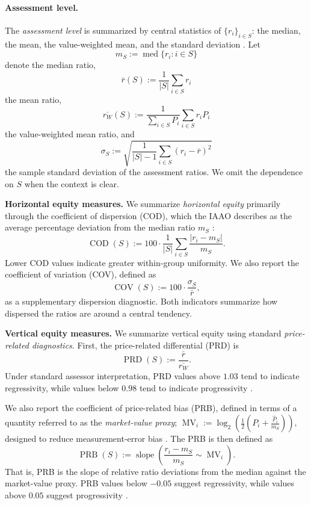 \documentclass{article}
\theoremstyle{plain}
\theoremstyle{definition}
\newcommand{\1}{\mathbf{1}}
\begin{document}
\paragraph{Assessment level.}
The \emph{assessment level} is summarized by central statistics of $\{r_i\}_{i\in S}$: the median, the mean, the value-weighted mean, and the standard deviation \cite{IAAO2025ExposureRatio}. Let
\[
m_S := \operatorname{med}\{r_i: i\in S\}
\]
denote the median ratio,
\[
\bar r (S) := \frac{1}{|S|}\sum_{i\in S} r_i
\]
the mean ratio,
\[
\overline{r_W} (S) := \frac{1}{\sum_{i\in S} P_i}\sum_{i\in S} r_i P_i
\]
the value-weighted mean ratio, and
\[
\sigma_S := \sqrt{\frac{1}{|S|-1}\sum_{i\in S}(r_i-\bar r)^2}
\]
the sample standard deviation of the assessment ratios. We omit the dependence on $S$ when the context is clear.

\medskip
\noindent\textbf{Horizontal equity measures.}
We summarize \textit{horizontal equity} primarily through the coefficient of dispersion (COD), which the IAAO describes as the average percentage deviation from the median ratio $m_S$ \cite{IAAO2013Ratio,IAAO2025ExposureRatio}:
\begin{equation}
\label{eq:cod}
\operatorname{COD}(S)
:=
100\cdot\frac{1}{|S|}
\sum_{i\in S}\frac{|r_i-m_S|}{m_S}.
\end{equation}
Lower COD values indicate greater within-group uniformity. We also report the coefficient of variation (COV), defined as
\begin{equation}
\label{eq:cov_metric}
\operatorname{COV}(S)
:=
100\cdot\frac{\sigma_S}{\bar r},
\end{equation}
as a supplementary dispersion diagnostic. Both indicators summarize how dispersed the ratios are around a central tendency.

\medskip
\noindent\textbf{Vertical equity measures.}
We summarize vertical equity using standard \textit{price-related diagnostics}. First, the price-related differential (PRD) is
\begin{equation}
\label{eq:prd}
\operatorname{PRD}(S)
:=
\frac{\bar r}{\overline{r_W}}.
\end{equation}
Under standard assessor interpretation, PRD values above $1.03$ tend to indicate regressivity, while values below $0.98$ tend to indicate progressivity \cite{IAAO2013Ratio,IAAO2025ExposureRatio}.

We also report the coefficient of price-related bias (PRB), defined in terms of a quantity referred to as the \textit{market-value proxy}; \cite{IAAO2025ExposureRatio}
$
\operatorname{MV}_i
:=
\log_2\!\left(\frac{1}{2}\left(P_i+\frac{\widehat P_i}{m_S}\right)\right),
$
designed to reduce measurement-error bias \cite{IAAO2025ExposureRatio}. The PRB is then defined as
\begin{equation}
\label{eq:prb}
\operatorname{PRB}(S)
:=
\operatorname{slope}\!\left(\frac{r_i-m_S}{m_S}\sim \operatorname{MV}_i\right).
\end{equation}
That is, PRB is the slope of relative ratio deviations from the median against the market-value proxy. PRB values below $-0.05$ suggest regressivity, while values above $0.05$ suggest progressivity \cite{IAAO2013Ratio,IAAO2025ExposureRatio}.
\end{document}
